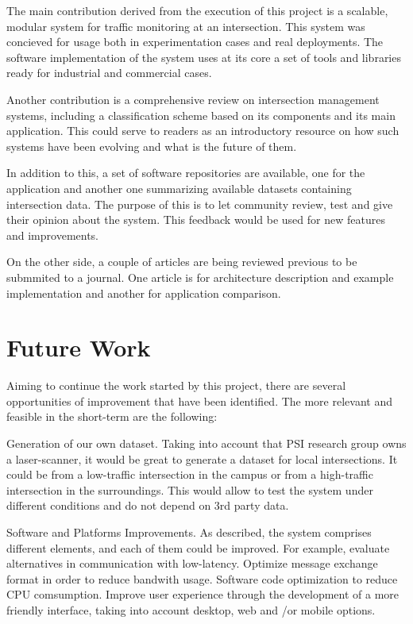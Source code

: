 The main contribution derived from the execution of this project is a scalable, modular system for traffic monitoring at an intersection. This system was concieved for usage both in experimentation cases and real deployments. The software implementation of the system uses at its core a set of tools and libraries ready for industrial and commercial cases.

Another contribution is a comprehensive review on intersection management systems, including a classification scheme based on its components and its main application. This could serve to readers as an introductory resource on how such systems have been evolving and what is the future of them.

In addition to this, a set of software repositories are available, one for the application and another one summarizing available datasets containing intersection data. The purpose of this is to let community review, test and give their opinion about the system. This feedback would be used for new features and improvements. 

On the other side, a couple of articles are being reviewed previous to be submmited to a journal. One article is for architecture description and example implementation and another for application comparison.

\section{Future Work}

Aiming to continue the work started by this project, there are several opportunities of improvement that have been identified. The more relevant and feasible in the short-term are the following:

Generation of our own dataset. Taking into account that PSI research group owns a laser-scanner, it would be great to generate a dataset for local intersections. It could be from a low-traffic intersection in the campus or from a high-traffic intersection in the surroundings. This would allow to test the system under different conditions and do not depend on 3rd party data.

Software and Platforms Improvements. As described, the system comprises different elements, and each of them could be improved. For example, evaluate alternatives in communication with low-latency. Optimize message exchange format in order to reduce bandwith usage. Software code optimization to reduce CPU comsumption. Improve user experience through the development of a more friendly interface, taking into account desktop, web and /or mobile options.

